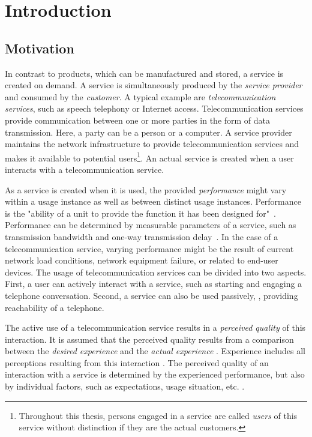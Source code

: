 \chapter{Introduction}\label{chap:01}

\section{Motivation}
In contrast to products, which can be manufactured and stored, a service is created on demand.
A service is simultaneously produced by the \emph{service provider} and consumed by the \emph{customer}.
A typical example are \emph{telecommunication services}, such as speech telephony or Internet access.
Telecommunication services provide communication between one or more parties in the form of data transmission.
Here, a party can be a person or a computer.
A service provider maintains the network infrastructure to provide telecommunication services and makes it available to potential users\footnote{Throughout this thesis, persons engaged in a service are called \emph{users} of this service without distinction if they are the actual customers.}.
An actual service is created when a user interacts with a telecommunication service.

As a service is created when it is used, the provided \emph{performance} might vary within a usage instance as well as between distinct usage instances.
Performance is the "ability of a unit to provide the function it has been designed for"~\citep[][p.\,360]{moller_quality_2005}.
Performance can be determined by measurable parameters of a service, such as transmission bandwidth and one-way transmission delay~\citep[][p.\,12]{moller_assessment_2000}.
In the case of a telecommunication service, varying performance might be the result of current network load conditions, network equipment failure, or related to end-user devices.
The usage of telecommunication services can be divided into two aspects.
First, a user can actively interact with a service, such as starting and engaging a telephone conversation.
Second, a service can also be used passively, \eg, providing reachability of a telephone.

The active use of a telecommunication service results in a \emph{perceived quality} of this interaction.
It is assumed that the perceived quality results from a comparison between the \emph{desired experience} and the \emph{actual experience} \citep[][p.\,13]{raake_quality_2014}. %
Experience includes all perceptions resulting from this interaction \citep[][p.\,13]{raake_quality_2014}.
The perceived quality of an interaction with a service is determined by the experienced performance, but also by individual factors, such as expectations, usage situation, etc. \citep[\eg,][p.\,55ff.]{reiter_factors_2014}.

